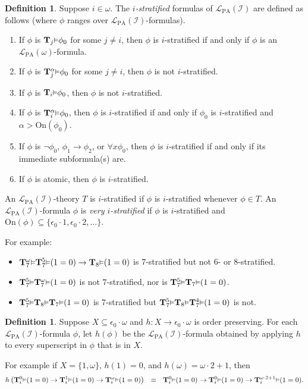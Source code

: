 \documentclass[reqno]{article}
\theoremstyle{definition}
\newtheorem{definition}[theorem]{Definition}
\def\L{\mathscr{L}}
\def\T{\mathbf{T}}
\def\LPA{\L_{\mathrm{PA}}}
\def\epom{\epsilon_0\cdot\omega}
\def\indset{\mathcal I}
\def\onset{\mathrm{On}}
\renewcommand{\Pr}[1]{\T_{#1}\mbox{\small${\vDash}$}}
\newcommand{\Prr}[2]{\T^{#1}_{#2}\mbox{\small${\vDash}$}}
\begin{document}
\begin{definition}
Suppose $i\in\omega$.
The \emph{$i$-stratified} formulas of $\LPA(\indset)$ are defined as follows (where $\phi$ ranges over $\LPA(\indset)$-formulas).
\begin{enumerate}
\item If $\phi$ is $\Pr j\phi_0$ for some $j\not=i$, then $\phi$ is $i$-stratified if and only if $\phi$ is an $\LPA(\omega)$-formula.
\item If $\phi$ is $\Prr\alpha j\phi_0$ for some $j\not=i$, then $\phi$ is not $i$-stratified.
\item If $\phi$ is $\Pr i\phi_0$, then $\phi$ is not $i$-stratified.
\item If $\phi$ is $\Prr\alpha i\phi_0$, then $\phi$ is $i$-stratified if and only if $\phi_0$ is $i$-stratified and
$\alpha>\onset(\phi_0)$.
\item If $\phi$ is $\neg\phi_0$, $\phi_1\rightarrow\phi_2$, or $\forall x\phi_0$,
then $\phi$ is $i$-stratified if and only if its immediate subformula(s) are.
\item If $\phi$ is atomic, then $\phi$ is $i$-stratified.
\end{enumerate}
An $\LPA(\indset)$-theory $T$ is $i$-stratified if $\phi$ is $i$-stratified whenever $\phi\in T$.
An $\LPA(\indset)$-formula $\phi$ is \emph{very $i$-stratified} if $\phi$ is $i$-stratified
and $\onset(\phi)\subseteq\{\epsilon_0\cdot 1,\epsilon_0\cdot 2,\ldots\}$.
\end{definition}

For example:
\begin{itemize}
\item $\Prr{\omega}7 \Prr 5 7(1=0)\rightarrow \Pr 8(1=0)$ is $7$-stratified but not $6$- or $8$-stratified.
\item $\Prr 5 7 \Prr\omega 7(1=0)$ is not $7$-stratified, nor is $\Prr 5 7 \Pr 7(1=0)$.
\item $\Prr 5 7 \Pr 8 \Pr 7(1=0)$ is $7$-stratified but $\Prr 5 7 \Pr 8 \Prr 4 7(1=0)$ is not.
\end{itemize}


\begin{definition}
Suppose $X\subseteq\epom$ and $h:X\to \epom$ is order preserving.
For each $\LPA(\indset)$-formula $\phi$,
let $h(\phi)$ be the $\LPA(\indset)$-formula obtained by applying $h$ to every superscript in $\phi$
that is in $X$.
\end{definition}

For example if $X=\{1,\omega\}$, $h(1)=0$, and $h(\omega)=\omega\cdot 2+1$,
then
\[
h\left(\Prr0i(1=0)\rightarrow\Prr1i(1=0)\rightarrow\Prr{\omega} i(1=0)\right)
\,\,\,\,\equiv\,\,\,\,
\Prr0i(1=0)\rightarrow\Prr0i(1=0)\rightarrow\Prr{\omega\cdot 2+1}i(1=0).
\]
\end{document}
